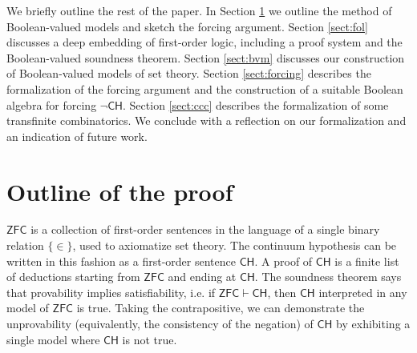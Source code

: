 \documentclass[a4paper,USenglish,cleveref, autoref]{lipics-v2019}
\theoremstyle{theorem}
\theoremstyle{definition}
\begin{document}
We briefly outline the rest of the paper. In Section \ref{sect:outline} we outline the method of Boolean-valued models and sketch the forcing argument. Section \ref{sect:fol} discusses a deep embedding of first-order logic, including a proof system and the Boolean-valued soundness theorem. Section \ref{sect:bvm} discusses our construction of Boolean-valued models of set theory. Section \ref{sect:forcing} describes the formalization of the forcing argument and the construction of a suitable Boolean algebra for forcing $\neg\mathsf{CH}$. Section \ref{sect:ccc} describes the formalization of some transfinite combinatorics. We conclude with a reflection on our formalization and an indication of future work.

\section{Outline of the proof}
\label{sect:outline}


$\mathsf{ZFC}$ is a collection of first-order sentences in the language of a single binary relation $\{\in\}$, used to axiomatize set theory. The continuum hypothesis can be written in this fashion as a first-order sentence $\mathsf{CH}$. A proof of $\mathsf{CH}$ is a finite list of deductions starting from $\mathsf{ZFC}$ and ending at $\mathsf{CH}$. %
The soundness theorem says that provability implies satisfiability, i.e. if $\mathsf{ZFC} \vdash \mathsf{CH}$, then $\mathsf{CH}$ interpreted in any model of $\mathsf{ZFC}$ is true. Taking the contrapositive, we can demonstrate the unprovability (equivalently, the consistency of the negation) of $\mathsf{CH}$ by exhibiting a single model where $\mathsf{CH}$ is not true.
\end{document}
